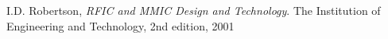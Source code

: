 

  \begin{thebibliography}{9}

		  I.D. Robertson, \emph{RFIC and MMIC Design and Technology}.
		  The Institution of Engineering and Technology,
		  2nd edition,
		  2001

  \end{thebibliography}
